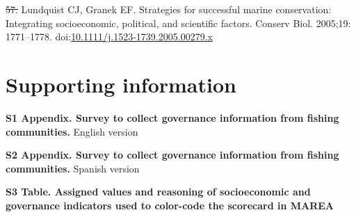 \documentclass[12pt,]{article}
\providecommand{\DIFaddtex}[1]{{\protect\color{blue}\uwave{#1}}} %
\providecommand{\DIFdeltex}[1]{{\protect\color{red}\sout{#1}}}                      %
\providecommand{\DIFaddbegin}{} %
\providecommand{\DIFaddend}{} %
\providecommand{\DIFdelbegin}{} %
\providecommand{\DIFdelend}{} %
\providecommand{\DIFadd}[1]{\texorpdfstring{\DIFaddtex{#1}}{#1}} %
\providecommand{\DIFdel}[1]{\texorpdfstring{\DIFdeltex{#1}}{}} %
\newcommand{\DIFscaledelfig}{0.5}
\newlength{\DIFdelgraphicswidth} %
\newlength{\DIFdelgraphicsheight} %
\newcommand{\DIFaddincludegraphics}[2][]{{\color{blue}\fbox{\DIFOincludegraphics[#1]{#2}}}} %
\newcommand{\DIFdelincludegraphics}[2][]{%
\sbox{\DIFdelgraphicsbox}{\DIFOincludegraphics[#1]{#2}}%
\settoboxwidth{\DIFdelgraphicswidth}{\DIFdelgraphicsbox} %
\settoboxtotalheight{\DIFdelgraphicsheight}{\DIFdelgraphicsbox} %
\scalebox{\DIFscaledelfig}{%
\parbox[b]{\DIFdelgraphicswidth}{\usebox{\DIFdelgraphicsbox}\\[-\baselineskip] \rule{\DIFdelgraphicswidth}{0em}}\llap{\resizebox{\DIFdelgraphicswidth}{\DIFdelgraphicsheight}{%
\setlength{\unitlength}{\DIFdelgraphicswidth}%
\begin{picture}(1,1)%
\thicklines\linethickness{2pt} %
{\color[rgb]{1,0,0}\put(0,0){\framebox(1,1){}}}%
{\color[rgb]{1,0,0}\put(0,0){\line( 1,1){1}}}%
{\color[rgb]{1,0,0}\put(0,1){\line(1,-1){1}}}%
\end{picture}%
}\hspace*{3pt}}} %
} %
\DeclareRobustCommand{\DIFaddbegin}{\DIFOaddbegin \let\includegraphics\DIFaddincludegraphics} %
\DeclareRobustCommand{\DIFaddend}{\DIFOaddend \let\includegraphics\DIFOincludegraphics} %
\DeclareRobustCommand{\DIFdelbegin}{\DIFOdelbegin \let\includegraphics\DIFdelincludegraphics} %
\DeclareRobustCommand{\DIFdelend}{\DIFOaddend \let\includegraphics\DIFOincludegraphics} %
\begin{document}
\DIFaddend \hypertarget{ref-lundquist_2005-OL}{}
\DIFdelbegin \DIFdel{57. }\DIFdelend \DIFaddbegin \DIFadd{65. }\DIFaddend Lundquist CJ, Granek EF. Strategies for successful marine
conservation: Integrating socioeconomic, political, and scientific
factors. Conserv Biol. 2005;19: 1771--1778.
doi:\href{https://doi.org/10.1111/j.1523-1739.2005.00279.x}{10.1111/j.1523-1739.2005.00279.x}

\section{Supporting information}\label{supporting-information}

\textbf{S1 Appendix. Survey to collect governance information from
fishing communities.} English version

\textbf{S2 Appendix. Survey to collect governance information from
fishing communities.} Spanish version

\textbf{S3 Table. Assigned values and reasoning of socioeconomic and
governance indicators used to color-code the scorecard in MAREA}
\end{document}
